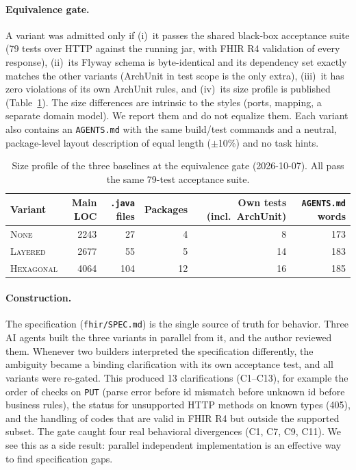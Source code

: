 \documentclass[10pt]{article}
\newcommand{\NONE}{\textsc{None}}
\newcommand{\LAY}{\textsc{Layered}}
\newcommand{\HEX}{\textsc{Hexagonal}}
\newcommand{\code}[1]{\texttt{#1}}
\begin{document}
\paragraph{Equivalence gate.} A variant was admitted only if (i)~it passes the shared black-box
acceptance suite (79 tests over HTTP against the running jar, with FHIR R4 validation of every
response), (ii)~its Flyway schema is byte-identical and its dependency set exactly matches the
other variants (ArchUnit in test scope is the only extra), (iii)~it has zero violations of its own
ArchUnit rules, and (iv)~its size profile is published (Table~\ref{tab:size}). The size
differences are intrinsic to the styles (ports, mapping, a separate domain model). We report them
and do not equalize them. Each variant also contains an \code{AGENTS.md} with the same build/test
commands and a neutral, package-level layout description of equal length ($\pm$10\%) and no task
hints.

\begin{table}[tbp]\centering
\caption{Size profile of the three baselines at the equivalence gate (2026-10-07). All pass the
same 79-test acceptance suite.}
\label{tab:size}
\small
\begin{tabular}{lrrrrr}
\toprule
Variant & Main LOC & \code{.java} files & Packages & Own tests (incl.\ ArchUnit) & \code{AGENTS.md} words\\
\midrule
\NONE & 2243 & 27 & 4 & 8 & 173\\
\LAY & 2677 & 55 & 5 & 14 & 183\\
\HEX & 4064 & 104 & 12 & 16 & 185\\
\bottomrule
\end{tabular}
\end{table}

\paragraph{Construction.} The specification (\code{fhir/SPEC.md}) is the single source of truth
for behavior. Three AI agents built the three variants in parallel from it, and the author
reviewed them. Whenever two builders interpreted the specification differently, the ambiguity
became a binding clarification with its own acceptance test, and all variants were re-gated. This
produced 13 clarifications (C1--C13), for example the order of checks on \code{PUT} (parse error
before id mismatch before unknown id before business rules), the status for unsupported HTTP
methods on known types (405), and the handling of codes that are valid in FHIR R4 but outside the
supported subset. The gate caught four real behavioral divergences (C1, C7, C9, C11). We see this
as a side result: parallel independent implementation is an effective way to find specification
gaps.
\end{document}
